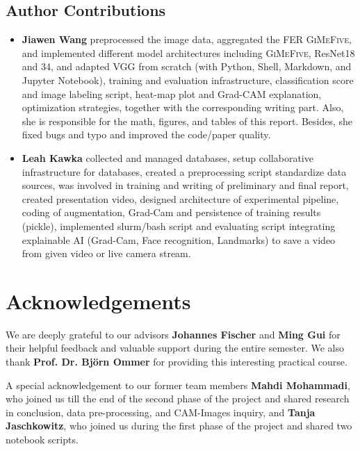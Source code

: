 \subsection*{Author Contributions}
\label{sec:author}

\begin{itemize}
  \item \textbf{Jiawen Wang} preprocessed the image data, aggregated the FER \textsc{GiMeFive}, 
  and implemented different model architectures including \textsc{GiMeFive}, ResNet18 and 34, 
  and adapted VGG from scratch (with Python, Shell, Markdown, and Jupyter Notebook), 
  training and evaluation infrastructure, classification score and image labeling script, 
  heat-map plot and Grad-CAM explanation, optimization strategies, 
  together with the corresponding writing part. 
  Also, she is responsible for the math, figures, and tables of this report. 
  Besides, she fixed bugs and typo and improved the code/paper quality. 
  \item \textbf{Leah Kawka} collected and managed databases, 
  setup collaborative infrastructure for databases, created a preprocessing script standardize data sources, 
  was involved in training and writing of preliminary and final report, created presentation video, 
  designed architecture of experimental pipeline, coding of augmentation, Grad-Cam and persistence 
  of training results (pickle), implemented slurm/bash script and evaluating script integrating explainable AI 
  (Grad-Cam, Face recognition, Landmarks) to save a video from given video or live camera stream.
\end{itemize}

\section*{Acknowledgements}

We are deeply grateful to our advisors \textbf{Johannes Fischer} and \textbf{Ming Gui} for their helpful feedback and valuable support during the entire semester. 
We also thank \textbf{Prof. Dr. Björn Ommer} for providing this interesting practical course. 

A special acknowledgement to our former team members \textbf{Mahdi Mohammadi}, who joined us till the end of the 
second phase of the project and shared research in conclusion, data pre-processing, and CAM-Images inquiry, 
and \textbf{Tanja Jaschkowitz}, who joined us during the first phase of the project and shared two notebook scripts.
  
